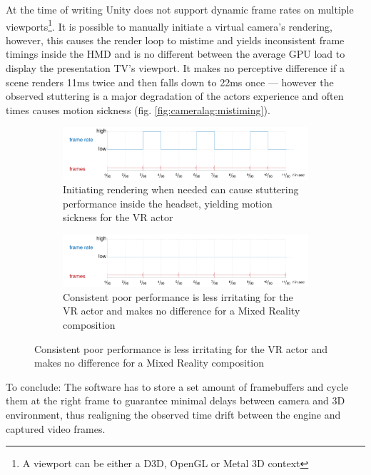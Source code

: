 At the time of writing Unity does not support dynamic frame rates on multiple 
viewports\footnote{A viewport can be either a D3D, OpenGL or Metal 3D context}.
\newline
It is possible to manually initiate a virtual camera's rendering, however, this 
causes the render loop to mistime and yields inconsistent frame timings inside 
the HMD and is no different between the average GPU load to display the 
presentation TV's viewport. It makes no perceptive difference if a scene 
renders 11ms twice and then falls down to 22ms once --- however the observed 
stuttering is a major degradation of the actors experience and often times 
causes motion sickness (fig. \ref{fig:cameralag:mistiming}).

\begin{figure}[htbp]
	\caption{Differences in performance based on rendering strategy}
	\label{fig:cameralag:mistiming}
	\begin{subfigure}[t]{\textwidth}
		\centering
		\includegraphics[width=\textwidth]{gfx/mistiming/variable.pdf}
		\caption{Initiating rendering when needed can cause stuttering 
		performance inside the headset, yielding motion sickness for the VR 
		actor}
	\end{subfigure}
	\begin{subfigure}[t]{\textwidth}
		\centering
		\includegraphics[width=\textwidth]{gfx/mistiming/stable.pdf}
		\caption{Consistent poor performance is less irritating for the VR 
		actor and makes no difference for a Mixed Reality composition}
	\end{subfigure}
\end{figure}

To conclude: The software has to store a set amount of \gls{framebuffer}s and 
cycle them at the right frame to guarantee minimal delays between camera and 3D 
environment, thus realigning the observed time drift between the engine and 
captured video frames.

